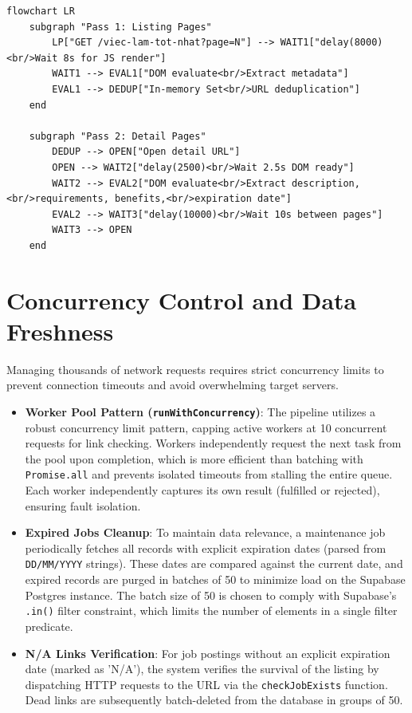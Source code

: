 \begin{verbatim}
flowchart LR
    subgraph "Pass 1: Listing Pages"
        LP["GET /viec-lam-tot-nhat?page=N"] --> WAIT1["delay(8000)<br/>Wait 8s for JS render"]
        WAIT1 --> EVAL1["DOM evaluate<br/>Extract metadata"]
        EVAL1 --> DEDUP["In-memory Set<br/>URL deduplication"]
    end
    
    subgraph "Pass 2: Detail Pages"
        DEDUP --> OPEN["Open detail URL"]
        OPEN --> WAIT2["delay(2500)<br/>Wait 2.5s DOM ready"]
        WAIT2 --> EVAL2["DOM evaluate<br/>Extract description,<br/>requirements, benefits,<br/>expiration date"]
        EVAL2 --> WAIT3["delay(10000)<br/>Wait 10s between pages"]
        WAIT3 --> OPEN
    end
\end{verbatim}

\section{Concurrency Control and Data Freshness}
Managing thousands of network requests requires strict concurrency limits to prevent connection timeouts and avoid overwhelming target servers.

\begin{itemize}
\item \textbf{Worker Pool Pattern (\texttt{runWithConcurrency})}: The pipeline utilizes a robust concurrency limit pattern, capping active workers at 10 concurrent requests for link checking. Workers independently request the next task from the pool upon completion, which is more efficient than batching with \texttt{Promise.all} and prevents isolated timeouts from stalling the entire queue. Each worker independently captures its own result (fulfilled or rejected), ensuring fault isolation.
\item \textbf{Expired Jobs Cleanup}: To maintain data relevance, a maintenance job periodically fetches all records with explicit expiration dates (parsed from \texttt{DD/MM/YYYY} strings). These dates are compared against the current date, and expired records are purged in batches of 50 to minimize load on the Supabase Postgres instance. The batch size of 50 is chosen to comply with Supabase's \texttt{.in()} filter constraint, which limits the number of elements in a single filter predicate.
\item \textbf{N/A Links Verification}: For job postings without an explicit expiration date (marked as 'N/A'), the system verifies the survival of the listing by dispatching HTTP requests to the URL via the \texttt{checkJobExists} function. Dead links are subsequently batch-deleted from the database in groups of 50.
\end{itemize}

